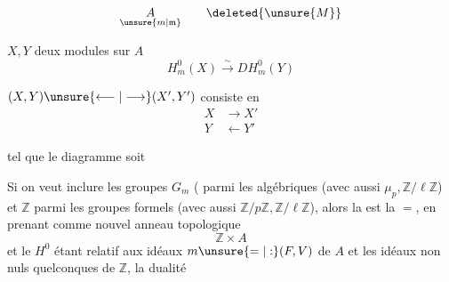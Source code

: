 
\[\underset{\unsure{m|\mathfrak m}}{A}\qquad\deleted{\unsure{M}}\]

$X,Y$ deux modules sur $A$
\[H^0_m(X)\xrightarrow{\sim}DH^0_m(Y)\]

$(X,Y)\unsure{\longleftarrow|\longrightarrow}(X',Y')$ consiste en
\[\begin{aligned}X&\longrightarrow X'\\Y&\longleftarrow Y'\end{aligned}\]

tel que le diagramme
soit 

Si on veut inclure les groupes $G_m$ ( parmi les algébriques (avec aussi $\mu_p,\mathbb Z/\ell\mathbb Z$) et $\mathbb Z$ parmi les groupes formels (avec aussi $\mathbb Z/p\mathbb Z,\mathbb Z/\ell\mathbb Z$), alors la  est la $=$, en prenant comme nouvel anneau topologique
\[\mathbb Z\times A\]
et le $H^0$ étant relatif aux idéaux $m\unsure{=|:}(F,V)$ de $A$ et les idéaux non nuls quelconques de $\mathbb Z$, la dualité
